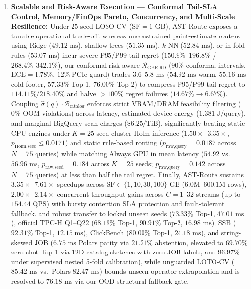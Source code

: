 \documentclass[10pt,a4paper]{article}
\begin{document}
\begin{enumerate}
\item \textbf{Scalable and Risk-Aware Execution --- Conformal Tail-SLA Control, Memory/FinOps Pareto, Concurrency, and Multi-Scale Resilience:} Under $25$-seed LOSO-CV ($\text{SF}=1\text{ GB}$), AST-Route exposes a tunable operational trade-off: whereas unconstrained point-estimate routers using Ridge ($49.12\text{ ms}$), shallow trees ($51.35\text{ ms}$), $k$-NN ($52.84\text{ ms}$), or in-fold rules ($53.07\text{ ms}$) incur severe P95/P99 tail regret ($150.9\%\text{--}196.8\%$ / $268.4\%\text{--}342.1\%$), our conformal risk-aware $\mathcal{R}_{\text{GBR-9D}}$ ($90\%$ conformal intervals, $\text{ECE}=1.78\%$, $12\%$ PCIe guard) trades $3.6\text{--}5.8\text{ ms}$ ($54.92\text{ ms}$ warm, $55.16\text{ ms}$ cold footer, $57.33\%$ Top-1, $76.00\%$ Top-2) to compress P95/P99 tail regret to $114.11\%/218.40\%$ and halve $>100\%$ regret failures ($14.67\%\rightarrow 6.67\%$). Coupling $\hat{\sigma}(q)\cdot\mathcal{B}_{\text{catalog}}$ enforces strict VRAM/DRAM feasibility filtering ($0\%$ OOM violations) across latency, estimated device energy ($1.381\text{ J/query}$), and marginal BigQuery scan charges ($\$6.25/\text{TiB}$), significantly beating static CPU engines under $K=25$ seed-cluster Holm inference ($1.50\times\text{--}3.35\times$, $p_{\text{Holm,seed}}\le 0.0171$) and static rule-based routing ($p_{\text{raw,query}}=0.0187$ across $N=75$ queries) while matching Always GPU in mean latency ($54.92$ vs.\ $56.96\text{ ms}$, $p_{\text{raw,seed}}=0.184$ across $K=25$ seeds; $p_{\text{raw,query}}=0.142$ across $N=75$ queries) at less than half the tail regret. Finally, AST-Route sustains $3.35\times\text{--}7.61\times$ speedups across $\text{SF}\in\{1,10,30,100\}\text{ GB}$ ($6.0\text{M--}600.1\text{M}$ rows), $2.00\times\text{--}2.14\times$ concurrent throughput gains across $C=1\text{--}32$ streams (up to $154.44\text{ QPS}$) with bursty contention SLA protection and fault-tolerant fallback, and robust transfer to locked unseen seeds ($73.33\%$ Top-1, $47.01\text{ ms}$), official TPC-H Q1--Q22 ($68.18\%$ Top-1, $90.91\%$ Top-2, $16.98\text{ ms}$), SSB ($92.31\%$ Top-1, $12.15\text{ ms}$), ClickBench ($80.00\%$ Top-1, $24.18\text{ ms}$), and string-skewed JOB ($6.75\text{ ms}$ Polars parity via $21.21\%$ abstention, elevated to $69.70\%$ zero-shot Top-1 via $12\text{D}$ catalog sketches with zero JOB labels, and $96.97\%$ under supervised nested 5-fold calibration), while unguarded LOTO-CV ($85.42\text{ ms}$ vs.\ Polars $82.47\text{ ms}$) bounds unseen-operator extrapolation and is resolved to $76.18\text{ ms}$ via our OOD structural fallback gate.
\end{enumerate}
\end{document}
